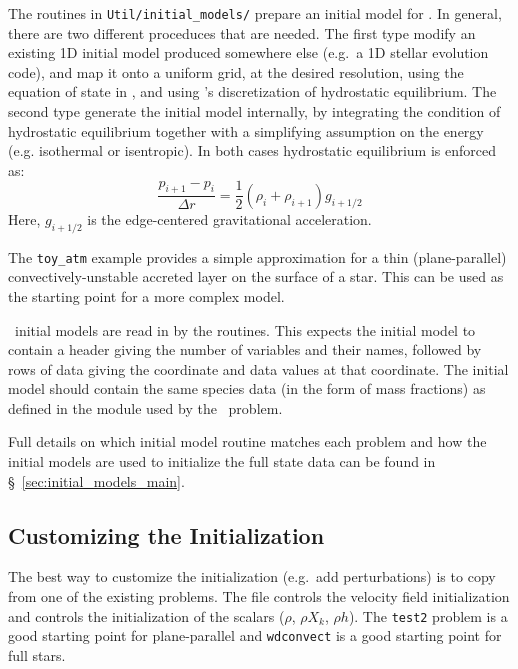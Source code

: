 The routines in {\tt Util/initial\_models/} prepare an initial model
for \maestro.  In general, there are two different proceduces that are
needed.  The first type modify an existing 1D initial model produced
somewhere else (e.g.\ a 1D stellar evolution code), and map it onto a
uniform grid, at the desired resolution, using the equation of state
in \maestro, and using \maestro's discretization of hydrostatic
equilibrium.  The second type generate the initial model internally,
by integrating the condition of hydrostatic equilibrium together with
a simplifying assumption on the energy (e.g. isothermal or
isentropic).  In both cases hydrostatic equilibrium is enforced as:
\begin{equation}
\frac{p_{i+1} - p_i}{\Delta r} = \frac{1}{2} (\rho_i + \rho_{i+1})
g_{i+1/2}
\end{equation}
Here, $g_{i+1/2}$ is the edge-centered gravitational acceleration.

The {\tt toy\_atm} example provides a simple approximation for a thin
(plane-parallel) convectively-unstable accreted layer on the surface
of a star.  This can be used as the starting point for a more complex
model.  

\maestro\ initial models are read in by the 
routines.  This expects the initial model to contain a header giving
the number of variables and their names, followed by rows of data
giving the coordinate and data values at that coordinate.  The initial
model should contain the same species data (in the form of mass fractions) as
defined in the  module used by the \maestro\ problem.

Full details on which initial model routine matches each problem and
how the initial models are used to initialize the full state data can
be found in \S~\ref{sec:initial_models_main}.

\subsection{Customizing the Initialization}

The best way to customize the initialization (e.g.\ add perturbations)
is to copy from one of the existing problems.  The file  controls the velocity field initialization and  controls the initialization of the scalars
($\rho$, $\rho X_k$, $\rho h$).  The {\tt test2} problem is a good
starting point for plane-parallel and {\tt wdconvect} is a good
starting point for full stars.




